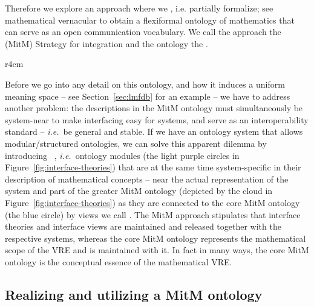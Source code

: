 Therefore we explore an approach where we , i.e. partially formalize;
see~\cite{Kohlhase:tffm13} mathematical vernacular to obtain a flexiformal ontology of
mathematics that can serve as an open communication vocabulary. We call the approach the
 (MitM) Strategy for integration and the ontology the .

\begin{wrapfigure}r{4cm}%
  \vspace*{-.5em}
  \caption{Interface theories}\label{fig:interface-theories}\vspace*{-1em}
\end{wrapfigure}
Before we go into any detail on this ontology, and how it induces a uniform
meaning space -- see Section~\ref{sec:lmfdb} for an example -- we have to address another
problem: the descriptions in the MitM ontology must simultaneously be system-near to make
interfacing easy for systems, and serve as an interoperability standard -- \emph{i.e.}\ be
general and stable. If we have an ontology system that allows modular/structured
ontologies, we can solve this apparent dilemma by introducing ~\cite{KohRabSac:fvip11}, \emph{i.e.}\ ontology modules (the light purple
circles in Figure~\ref{fig:interface-theories}) that are at the same time system-specific
in their description of mathematical concepts -- near the actual representation of the
system and part of the greater MitM ontology (depicted by the cloud in
Figure~\ref{fig:interface-theories}) as they are connected to the core MitM ontology (the
blue circle) by views we call .  The MitM approach stipulates
that interface theories and interface views are maintained and released together with the
respective systems, whereas the core MitM ontology represents the mathematical scope of
the VRE and is maintained with it. In fact in many ways, the core MitM ontology is the
conceptual essence of the mathematical VRE.

\subsection{Realizing and utilizing a MitM ontology}

